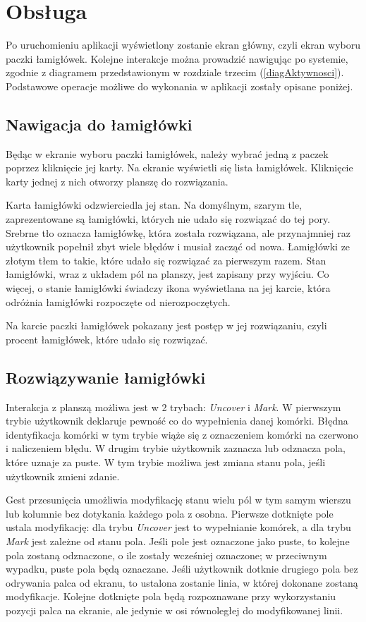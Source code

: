 \section{Obsługa}
    Po uruchomieniu aplikacji wyświetlony zostanie ekran główny, czyli ekran wyboru paczki łamigłówek.
Kolejne interakcje można prowadzić nawigując po systemie, zgodnie z diagramem przedstawionym w
rozdziale trzecim (\ref{diagAktywnosci}). Podstawowe operacje możliwe do wykonania w aplikacji
zostały opisane poniżej.


\subsection{Nawigacja do łamigłówki}
    Będąc w ekranie wyboru paczki łamigłówek, należy wybrać jedną z paczek poprzez kliknięcie jej
karty. Na ekranie wyświetli się lista łamigłówek. Kliknięcie karty jednej z nich otworzy planszę
do rozwiązania.

    Karta łamigłówki odzwierciedla jej stan. Na domyślnym, szarym tle, zaprezentowane są łamigłówki,
których nie udało się rozwiązać do tej pory. Srebrne tło oznacza łamigłówkę, która została rozwiązana,
ale przynajmniej raz użytkownik popełnił zbyt wiele błędów i musiał zacząć od nowa. Łamigłówki
ze złotym tłem to takie, które udało się rozwiązać za pierwszym razem. Stan łamigłówki, wraz z
układem pól na planszy, jest zapisany przy wyjściu. Co więcej, o stanie łamigłówki świadczy ikona
wyświetlana na jej karcie, która odróżnia łamigłówki rozpoczęte od nierozpoczętych.

    Na karcie paczki łamigłówek pokazany jest postęp w jej rozwiązaniu, czyli procent łamigłówek, 
które udało się rozwiązać.


\subsection{Rozwiązywanie łamigłówki}
    Interakcja z planszą możliwa jest w 2 trybach: \textit{Uncover} i \textit{Mark}. W pierwszym
trybie użytkownik deklaruje pewność co do wypełnienia danej komórki. Błędna identyfikacja komórki
w tym trybie wiąże się z oznaczeniem komórki na czerwono i naliczeniem błędu.
W drugim trybie użytkownik zaznacza lub odznacza pola, które uznaje za puste. W tym trybie możliwa
jest zmiana stanu pola, jeśli użytkownik zmieni zdanie.

    Gest przesunięcia umożliwia modyfikację stanu wielu pól w tym samym wierszu lub kolumnie bez
dotykania każdego pola z osobna. Pierwsze dotknięte pole ustala modyfikację: dla trybu \textit{Uncover}
jest to wypełnianie komórek, a dla trybu \textit{Mark} jest zależne od stanu pola. Jeśli pole jest
oznaczone jako puste, to kolejne pola zostaną odznaczone, o ile zostały wcześniej oznaczone; w
przeciwnym wypadku, puste pola będą oznaczane. Jeśli użytkownik dotknie drugiego pola bez odrywania
palca od ekranu, to ustalona zostanie linia, w której dokonane zostaną modyfikacje. Kolejne
dotknięte pola będą rozpoznawane przy wykorzystaniu pozycji palca na ekranie, ale jedynie w osi
równoległej do modyfikowanej linii.


